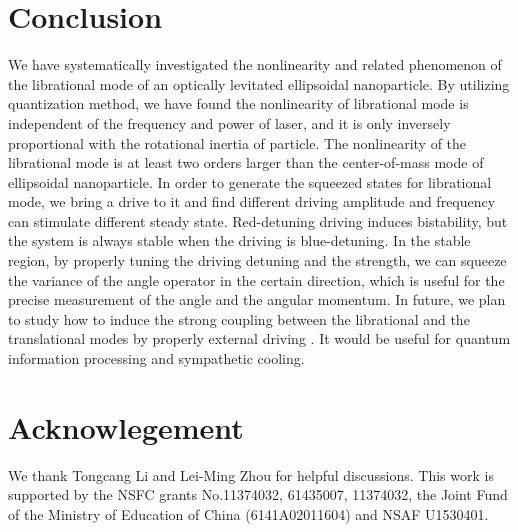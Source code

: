 \documentclass[pra,aps,superscriptaddress,showpacs,preprint]{revtex4}%
\begin{document}
\section{Conclusion}
\label{SectV}

We have systematically investigated the nonlinearity and related phenomenon of the librational mode of an optically levitated ellipsoidal nanoparticle.  By utilizing quantization method, we have found the nonlinearity of librational mode is independent of the frequency and power of laser, and it is only inversely proportional with the rotational inertia of particle.  The nonlinearity of the librational mode is at least two orders larger than the center-of-mass mode of ellipsoidal nanoparticle.
In order to generate the squeezed states for librational mode, we bring a drive to it and find different driving amplitude and frequency can stimulate different steady state. Red-detuning driving induces bistability, but the system is always stable when the driving is blue-detuning. In the stable region, by properly tuning the driving detuning and the strength, we can squeeze the variance of the angle operator in the certain direction, which is useful for the precise measurement of the angle and the angular momentum. In future, we plan to study how to induce the strong
coupling between the librational and the translational modes by properly external driving  \cite{Liu17}. It would be useful for quantum information processing and sympathetic cooling.


\section{Acknowlegement} %
We thank Tongcang Li and Lei-Ming Zhou for helpful discussions.
This work is supported by the NSFC grants No.11374032, 61435007, 11374032, the Joint Fund of the Ministry of Education of China (6141A02011604) and NSAF U1530401.

%
\end{document}

